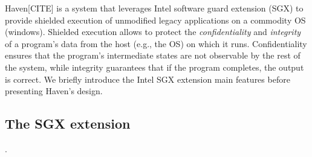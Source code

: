 Haven[CITE] is a system that leverages Intel software guard extension (SGX) to provide shielded execution of unmodified legacy applications on a commodity OS (windows).
Shielded execution allows to protect the \emph{confidentiality} and \emph{integrity} of a program's data from the host (e.g., the OS) on which it runs.
Confidentiality ensures that the program's intermediate states are not observable by the rest of the system, while integrity guarantees that if the program completes, the output is correct.
We briefly introduce the Intel SGX extension main features before presenting Haven's design.



\subsection{The SGX extension}
%
.\\



